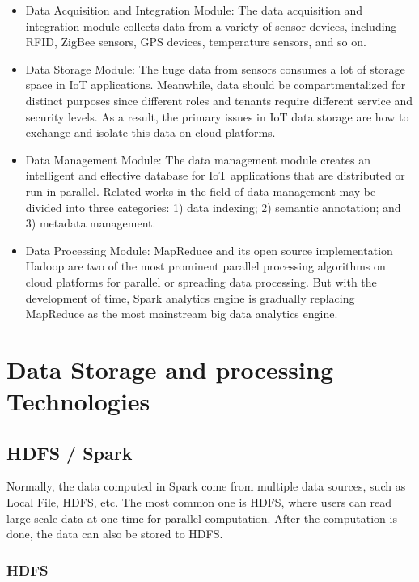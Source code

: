\begin{itemize}
\item Data Acquisition and Integration Module: The data acquisition and integration module collects data from a variety of sensor devices, including RFID, ZigBee sensors, GPS devices, temperature sensors, and so on\cite{7600359}.
\item Data Storage Module: The huge data from sensors consumes a lot of storage space in IoT applications. Meanwhile, data should be compartmentalized for distinct purposes since different roles and tenants require different service and security levels\cite{7600359}. As a result, the primary issues in IoT data storage are how to exchange and isolate this data on cloud platforms.
\item Data Management Module: The data management module creates an intelligent and effective database for IoT applications that are distributed or run in parallel\cite{7600359}. Related works in the field of data management may be divided into three categories: 1) data indexing; 2) semantic annotation; and 3) metadata management.
\item Data Processing Module: MapReduce and its open source implementation Hadoop are two of the most prominent parallel processing algorithms on cloud platforms for parallel or spreading data processing\cite{7600359}. But with the development of time, Spark analytics engine is gradually replacing MapReduce as the most mainstream big data analytics engine\cite{7857034}.
\end{itemize}

\section{Data Storage and processing Technologies}
\subsection{HDFS / Spark}

Normally, the data computed in Spark come from multiple data sources, such as Local File, HDFS, etc. The most common one is HDFS, where users can read large-scale data at one time for parallel computation. After the computation is done, the data can also be stored to HDFS.

\subsubsection{HDFS}

